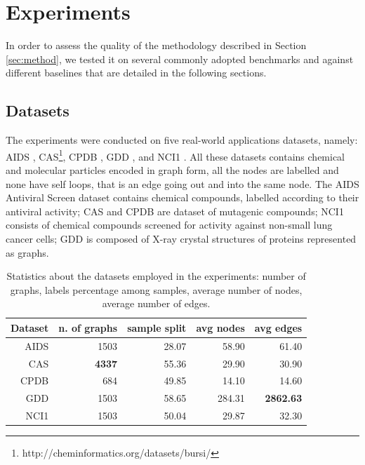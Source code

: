 
\chapter{Experiments}
\label{Chapter4}

In order to assess the quality of the methodology described in Section \ref{sec:method},
we tested it on several commonly adopted benchmarks and against different baselines
that are detailed in the following sections.

\section{Datasets}
\label{subsec:datasets}

The experiments were conducted on five real-world applications datasets, namely:
AIDS \cite{Weislow19041989}, CAS\footnote{http://cheminformatics.org/datasets/bursi/},
CPDB \cite{journals/jcisd/HelmaCKR04}, GDD \cite{dobson2003}, and NCI1 \cite{journals/kais/WaleWK08}.
All these datasets contains chemical and molecular particles encoded in graph form,
all the nodes are labelled and none have self loops, that is an edge going out
and into the same node.
The AIDS Antiviral Screen dataset contains chemical compounds, labelled according to
their antiviral activity; CAS and CPDB are dataset of mutagenic
compounds; NCI1 consists of chemical compounds screened for activity against 
non-small lung cancer cells; GDD is composed of X-ray crystal structures of
proteins represented as graphs.
    \begin{table}[ht]
        \centering
        \begin{tabular}{|r|r|r|r|r|}
            \hline
            Dataset & n. of graphs & sample split & avg nodes & avg edges \\ \hline
            AIDS    & 1503         & 28.07        & 58.90     & 61.40     \\ \hline      
            CAS     & \textbf{4337} & 55.36        & 29.90     & 30.90     \\ \hline      
            CPDB    &  684         & 49.85        & 14.10     & 14.60     \\ \hline      
            GDD     & 1503         & 58.65        & 284.31    & \textbf{2862.63}   \\ \hline      
            NCI1    & 1503         & 50.04        & 29.87     & 32.30     \\ \hline      
        \end{tabular}
        \caption{Statistics about the datasets employed in the experiments: number
        of graphs, labels percentage among samples, average number of nodes, average
        number of edges.}
        \label{table:datasets}
    \end{table}

